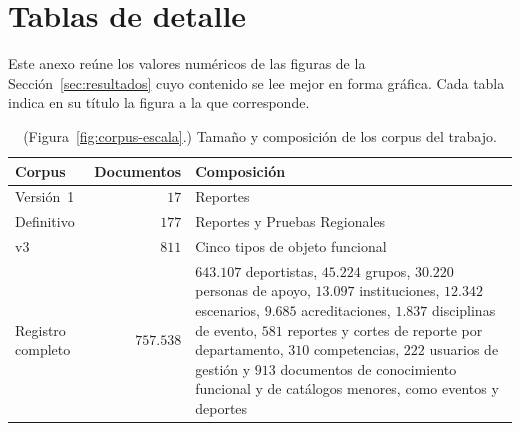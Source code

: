 \documentclass[11pt,letterpaper]{article}
\numberwithin{equation}{section}
\begin{document}
\section{Tablas de detalle}
\label{anx:tablas}
Este anexo reúne los valores numéricos de las figuras de la Sección~\ref{sec:resultados} cuyo contenido se lee mejor en forma gráfica. Cada tabla indica en su título la figura a la que corresponde.

\begin{table}[!htbp]
\centering
\footnotesize
\setlength{\tabcolsep}{6pt}
\renewcommand{\arraystretch}{1.15}
\caption{(Figura~\ref{fig:corpus-escala}.) Tamaño y composición de los corpus del trabajo.}
\label{tab:escala}
\begin{tabularx}{\textwidth}{@{}Y r Y@{}}
\toprule
\textbf{Corpus} & \textbf{Documentos} & \textbf{Composición} \\
\midrule
Versión~1 & $17$ & Reportes \\
Definitivo & $177$ & Reportes y Pruebas Regionales \\
v3 & $811$ & Cinco tipos de objeto funcional \\
Registro completo & $757.538$ & $643.107$ deportistas, $45.224$ grupos, $30.220$ personas de apoyo, $13.097$ instituciones, $12.342$ escenarios, $9.685$ acreditaciones, $1.837$ disciplinas de evento, $581$ reportes y cortes de reporte por departamento, $310$ competencias, $222$ usuarios de gestión y $913$ documentos de conocimiento funcional y de catálogos menores, como eventos y deportes \\
\bottomrule
\end{tabularx}
\end{table}
\end{document}

